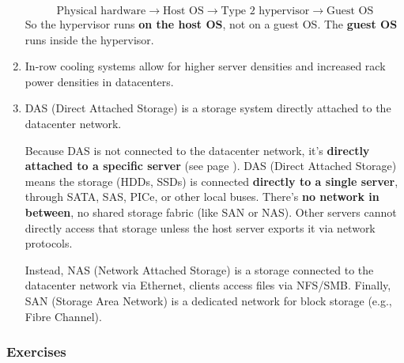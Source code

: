 \begin{enumerate}
\begin{deepeningbox}
        \begin{equation*}
            \text{Physical hardware} \rightarrow \text{Host OS} \rightarrow \text{Type 2 hypervisor} \rightarrow \text{Guest OS}
        \end{equation*}
        So the hypervisor runs \textbf{on the host OS}, not on a guest OS. The \textbf{guest OS} runs inside the hypervisor.
    \end{deepeningbox}
    \item \trueIcon \: In-row cooling systems allow for higher server densities and increased rack power densities in datacenters.
    \item \falseIcon \: DAS (Direct Attached Storage) is a storage system directly attached to the datacenter network.
    \begin{deepeningbox}
        Because DAS is not connected to the datacenter network, it's \textbf{directly attached to a specific server} (see page \pageref{paragraph: DAS, NAS and SAN}). DAS (Direct Attached Storage) means the storage (HDDs, SSDs) is connected \textbf{directly to a single server}, through SATA, SAS, PICe, or other local buses. There's \textbf{no network in between}, no shared storage fabric (like SAN or NAS). Other servers cannot directly access that storage unless the host server exports it via network protocols.

        \highspace
        Instead, NAS (Network Attached Storage) is a storage connected to the datacenter network via Ethernet, clients access files via NFS/SMB. Finally, SAN (Storage Area Network) is a dedicated network for block storage (e.g., Fibre Channel).
    \end{deepeningbox}
\end{enumerate}

\subsubsection*{Exercises}

